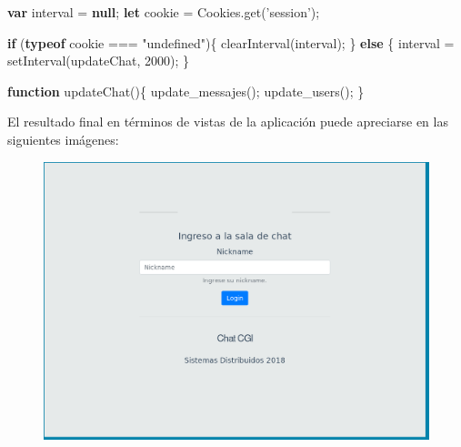 \documentclass[12pt]{extarticle}
\newenvironment{Shaded}{}{}
\newcommand{\KeywordTok}[1]{\textcolor[rgb]{0.00,0.44,0.13}{\textbf{{#1}}}}
\newcommand{\DecValTok}[1]{\textcolor[rgb]{0.25,0.63,0.44}{{#1}}}
\newcommand{\StringTok}[1]{\textcolor[rgb]{0.25,0.44,0.63}{{#1}}}
\newcommand{\NormalTok}[1]{{#1}}
\newcommand{\VariableTok}[1]{\textcolor[rgb]{0.10,0.09,0.49}{{#1}}}
\newcommand{\ControlFlowTok}[1]{\textcolor[rgb]{0.00,0.44,0.13}{\textbf{{#1}}}}
\newcommand{\OperatorTok}[1]{\textcolor[rgb]{0.40,0.40,0.40}{{#1}}}
\newcommand{\AttributeTok}[1]{\textcolor[rgb]{0.49,0.56,0.16}{{#1}}}
\begin{document}
\begin{Shaded}
\begin{Highlighting}[]
\KeywordTok{var}\NormalTok{ interval }\OperatorTok{=} \KeywordTok{null}\OperatorTok{;}
\KeywordTok{let}\NormalTok{ cookie }\OperatorTok{=} \VariableTok{Cookies}\NormalTok{.}\AttributeTok{get}\NormalTok{(}\StringTok{'session'}\NormalTok{)}\OperatorTok{;}

\ControlFlowTok{if}\NormalTok{ (}\KeywordTok{typeof}\NormalTok{ cookie }\OperatorTok{===} \StringTok{"undefined"}\NormalTok{)}\OperatorTok{\{}
    \AttributeTok{clearInterval}\NormalTok{(interval)}\OperatorTok{;}
\OperatorTok{\}} \ControlFlowTok{else} \OperatorTok{\{}       
\NormalTok{    interval }\OperatorTok{=} \AttributeTok{setInterval}\NormalTok{(updateChat}\OperatorTok{,} \DecValTok{2000}\NormalTok{)}\OperatorTok{;}
\OperatorTok{\}}

\KeywordTok{function} \AttributeTok{updateChat}\NormalTok{()}\OperatorTok{\{}
    \AttributeTok{update_messajes}\NormalTok{()}\OperatorTok{;}
    \AttributeTok{update_users}\NormalTok{()}\OperatorTok{;}
\OperatorTok{\}}
\end{Highlighting}
\end{Shaded}

    El resultado final en términos de vistas de la aplicación puede
apreciarse en las siguientes imágenes:

\begin{figure}[h]
\centering
\includegraphics{images/login-chat.png}
\end{figure}
\end{document}
